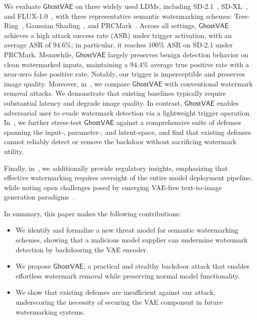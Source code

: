 \documentclass[letterpaper,twocolumn,10pt]{article}
\newcommand{\mg}{$\mathsf{GhostVAE}$\xspace}
\newcommand{\mypara}[1]{\smallskip\noindent{\bf {#1}.} \xspace}
\begin{document}
\mypara{Main Experimental Results}
We evaluate \mg on three widely used LDMs, including SD-2.1~\cite{Rombach2021HighResolutionIS}, SD-XL~\cite{podell2024sdxl}, and FLUX-1.0~\cite{labs2025flux1kontextflowmatching}, with three representative semantic watermarking schemes: Tree-Ring~\cite{NEURIPS2023_b54d1757}, Gaussian Shading~\cite{Yang2024GaussianSP}, and PRCMark~\cite{DBLP:conf/iclr/GunnZS25}.
Across all settings, \mg achieves a high attack success rate (ASR) under trigger activation, with an average ASR of $94.6\%$; in particular, it reaches $100\%$ ASR on SD-2.1 under PRCMark.
Meanwhile, \mg largely preserves benign detection behavior on clean watermarked inputs, maintaining a $94.4\%$ average true positive rate with a near-zero false positive rate.
Notably, our trigger is imperceptible and preserves image quality.
Moreover, in~, we compare \mg with conventional watermark removal attacks. 
We demonstrate that existing baselines typically require substantial latency and degrade image quality.
In contrast, \mg enables adversarial user to evade watermark detection via a lightweight trigger operation.
In~, we further stress-test \mg against a comprehensive suite of defenses spanning the input-, parameter-, and latent-space, and find that existing defenses cannot reliably detect or remove the backdoor without sacrificing watermark utility.

\mypara{Discussions}
Finally, in~, we additionally provide regulatory insights, emphasizing that effective watermarking requires oversight of the entire model deployment pipeline, while noting open challenges posed by emerging VAE-free text-to-image generation paradigms~\cite{lu2026onesteplatentfreeimagegeneration}.

In summary, this paper makes the following contributions:
\begin{itemize}
\item We identify and formalize a new threat model for semantic watermarking schemes, showing that a malicious model supplier can undermine watermark detection by backdooring the VAE encoder.
\item We propose \mg, a practical and stealthy backdoor attack that enables effortless watermark removal while preserving normal model functionality.
\item We show that existing defenses are insufficient against our attack, underscoring the necessity of securing the VAE component in future watermarking systems.
\end{itemize}
\end{document}
